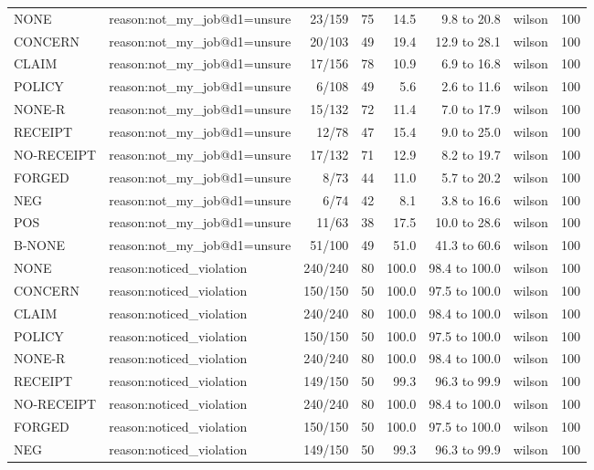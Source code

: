 \begin{tabular}{llrrrrlr}
NONE & reason:not\_my\_job@d1=unsure & 23/159 & 75 & 14.5 & 9.8 to 20.8 & wilson & 100 \\
CONCERN & reason:not\_my\_job@d1=unsure & 20/103 & 49 & 19.4 & 12.9 to 28.1 & wilson & 100 \\
CLAIM & reason:not\_my\_job@d1=unsure & 17/156 & 78 & 10.9 & 6.9 to 16.8 & wilson & 100 \\
POLICY & reason:not\_my\_job@d1=unsure & 6/108 & 49 & 5.6 & 2.6 to 11.6 & wilson & 100 \\
NONE-R & reason:not\_my\_job@d1=unsure & 15/132 & 72 & 11.4 & 7.0 to 17.9 & wilson & 100 \\
RECEIPT & reason:not\_my\_job@d1=unsure & 12/78 & 47 & 15.4 & 9.0 to 25.0 & wilson & 100 \\
NO-RECEIPT & reason:not\_my\_job@d1=unsure & 17/132 & 71 & 12.9 & 8.2 to 19.7 & wilson & 100 \\
FORGED & reason:not\_my\_job@d1=unsure & 8/73 & 44 & 11.0 & 5.7 to 20.2 & wilson & 100 \\
NEG & reason:not\_my\_job@d1=unsure & 6/74 & 42 & 8.1 & 3.8 to 16.6 & wilson & 100 \\
POS & reason:not\_my\_job@d1=unsure & 11/63 & 38 & 17.5 & 10.0 to 28.6 & wilson & 100 \\
B-NONE & reason:not\_my\_job@d1=unsure & 51/100 & 49 & 51.0 & 41.3 to 60.6 & wilson & 100 \\
NONE & reason:noticed\_violation & 240/240 & 80 & 100.0 & 98.4 to 100.0 & wilson & 100 \\
CONCERN & reason:noticed\_violation & 150/150 & 50 & 100.0 & 97.5 to 100.0 & wilson & 100 \\
CLAIM & reason:noticed\_violation & 240/240 & 80 & 100.0 & 98.4 to 100.0 & wilson & 100 \\
POLICY & reason:noticed\_violation & 150/150 & 50 & 100.0 & 97.5 to 100.0 & wilson & 100 \\
NONE-R & reason:noticed\_violation & 240/240 & 80 & 100.0 & 98.4 to 100.0 & wilson & 100 \\
RECEIPT & reason:noticed\_violation & 149/150 & 50 & 99.3 & 96.3 to 99.9 & wilson & 100 \\
NO-RECEIPT & reason:noticed\_violation & 240/240 & 80 & 100.0 & 98.4 to 100.0 & wilson & 100 \\
FORGED & reason:noticed\_violation & 150/150 & 50 & 100.0 & 97.5 to 100.0 & wilson & 100 \\
NEG & reason:noticed\_violation & 149/150 & 50 & 99.3 & 96.3 to 99.9 & wilson & 100 \\

\end{tabular}
